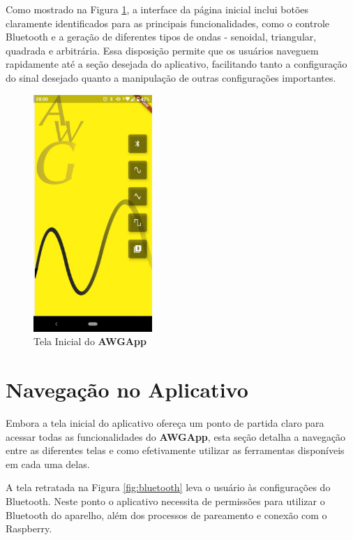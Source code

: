 \documentclass[12pt,a4paper]{book}
\newcommand{\nomesoftware}{AWGApp}
\begin{document}
Como mostrado na Figura \ref{fig:telainicial}, a interface da página inicial inclui botões claramente identificados para as principais funcionalidades, como o controle Bluetooth e a geração de diferentes tipos de ondas - senoidal, triangular, quadrada e arbitrária. Essa disposição permite que os usuários naveguem rapidamente até a seção desejada do aplicativo, facilitando tanto a configuração do sinal desejado quanto a manipulação de outras configurações importantes.

\begin{figure}[hbt!]
    \centering
    \includegraphics[width=0.4\textwidth]{figs/tela_ini.png}
    \caption{Tela Inicial do \textbf{\nomesoftware{}}}
    \label{fig:telainicial}
\end{figure}

\section{Navegação no Aplicativo}

Embora a tela inicial do aplicativo ofereça um ponto de partida claro para acessar todas as funcionalidades do \textbf{\nomesoftware}, esta seção detalha a navegação entre as diferentes telas e como efetivamente utilizar as ferramentas disponíveis em cada uma delas.

A tela retratada na Figura \ref{fig:bluetooth} leva o usuário às configurações do Bluetooth. Neste ponto o aplicativo necessita de permissões para utilizar o Bluetooth do aparelho, além dos processos de pareamento e conexão com o Raspberry.
\end{document}
